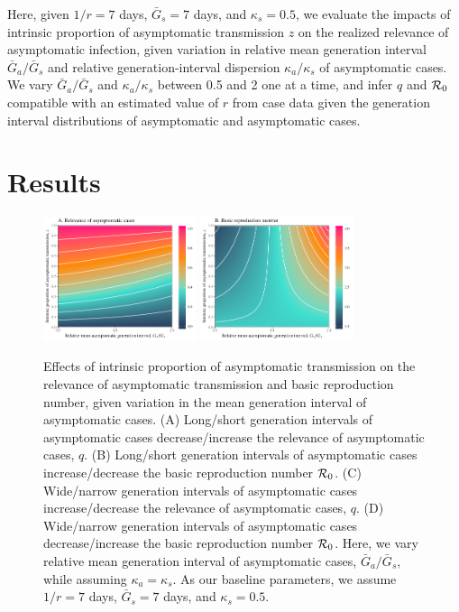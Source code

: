 Here, given $1/r=7$ days, $\bar G_s=7$ days, and $\kappa_s=0.5$, we evaluate the impacts of intrinsic proportion of asymptomatic transmission $z$ on the realized relevance of asymptomatic infection, given variation in relative mean generation interval $\bar G_a/\bar G_s$ and relative generation-interval dispersion $\kappa_a/\kappa_s$ of asymptomatic cases.
We vary $\bar G_a/\bar G_s$ and $\kappa_a/\kappa_s$ between 0.5 and 2 one at a time, and infer $q$ and ${\cal{R}}_0$ compatible with an estimated value of $r$ from case data given the generation interval distributions of asymptomatic and asymptomatic cases.

\section{Results}

\begin{figure}[b!]
\begin{center}
\includegraphics[width=0.4\textwidth]{figheatmap.pdf}
\mbox{\hspace{0.05\textwidth}}
\includegraphics[width=0.4\textwidth]{figheatmap_R0.pdf}
\caption{Effects of intrinsic proportion of asymptomatic transmission on the relevance of asymptomatic transmission and basic reproduction number, given variation in
the mean generation interval of asymptomatic cases. 
(A) Long/short generation intervals of asymptomatic cases decrease/increase the relevance of asymptomatic cases, $q$.
(B) Long/short generation intervals of asymptomatic cases increase/decrease the basic reproduction number ${\cal{R}}_0$.
(C) Wide/narrow generation intervals of asymptomatic cases increase/decrease the relevance of asymptomatic cases, $q$.
(D) Wide/narrow generation intervals of asymptomatic cases decrease/increase the basic reproduction number ${\cal{R}}_0$.
Here, we vary relative mean generation interval of asymptomatic cases, $\bar G_a/\bar G_s$, while assuming $\kappa_a = \kappa_s$.
As our baseline parameters, we assume $1/r=7$ days, $\bar G_s=7$ days, and $\kappa_s=0.5$.
\label{fig.relevance}}
\end{center}
\end{figure}

